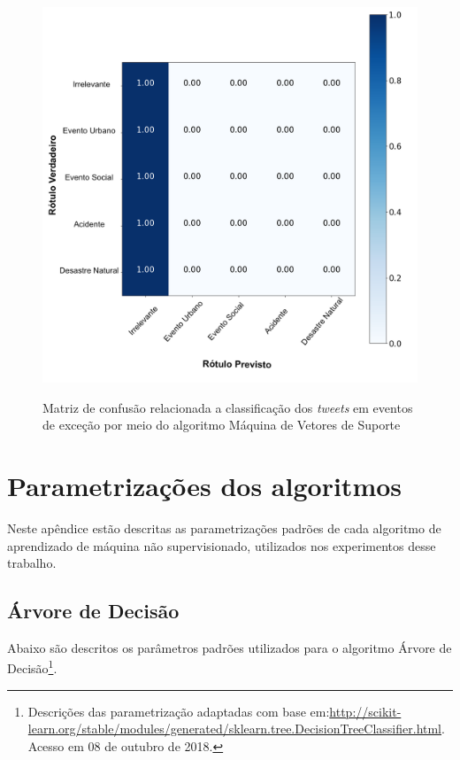 \documentclass[
	12pt,				%
	oneside,			%
	a4paper,			%
	english,			%
	brazil				%
	]{abntex2ppgsi}
\begin{document}
{{\begin{apendicesenv}
\begin{figure}[!htb]
	\centering
 	  \caption{Matriz de confusão relacionada a classificação dos \textit{tweets} em eventos de exceção por meio do algoritmo Máquina de Vetores de Suporte}
		\includegraphics[width=1\linewidth]{images/confusion_matrix_svm_pt.png}
	\label{fig:confusion_matrix_svm}
\end{figure}

\chapter{Parametrizações dos algoritmos}
\label{apendiceF}

Neste apêndice estão descritas as parametrizações padrões de cada algoritmo de aprendizado de máquina não supervisionado, utilizados nos experimentos desse trabalho.

\section{Árvore de Decisão}

Abaixo são descritos os parâmetros padrões utilizados para o algoritmo Árvore de Decisão\footnote{Descrições das parametrização adaptadas com base em:\url{http://scikit-learn.org/stable/modules/generated/sklearn.tree.DecisionTreeClassifier.html}. Acesso em 08 de outubro de 2018.}.


\end{apendicesenv}}}
\end{document}
